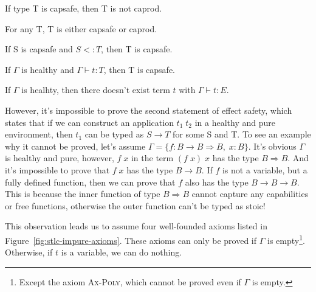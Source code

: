 \begin{lemma}
 If type T is capsafe, then T is not caprod.
\end{lemma}

\begin{lemma}
 For any T, T is either capsafe or caprod.
\end{lemma}

\begin{lemma}
 If S is capsafe and $S <: T$, then T is capsafe.
\end{lemma}

\begin{lemma}
  If $\Gamma$ is healthy and $\Gamma \vdash t : T$, then T is capsafe.
\end{lemma}

\begin{theorem}
  If $\Gamma$ is healhty, then there doesn't exist term $t$ with
  $\Gamma \vdash t : E$.
\end{theorem}

However, it's impossible to prove the second statement of effect
safety, which states that if we can construct an application
$t_1 \; t_2$ in a healthy and pure environment, then $t_1$ can be
typed as $S \to T$ for some S and T. To see an example why it cannot
be proved, let's assume
$\Gamma = \{f: B \to B \Rightarrow B, \; x: B\}$. It's obvious
$\Gamma$ is healthy and pure, however, $f \; x$ in the term
$(f \; x) \;x$ has the type $B \Rightarrow B$. And it's impossible to
prove that $f \; x$ has the type $B \to B$. If $f$ is not a variable,
but a fully defined function, then we can prove that $f$ also has the
type $B \to B \to B$. This is because the inner function of type
$B \Rightarrow B$ cannot capture any capabilities or free functions,
otherwise the outer function can't be typed as stoic!

This observation leads us to assume four well-founded axioms listed in
Figure~\ref{fig:stlc-impure-axioms}. These axioms can only be proved
if $\Gamma$ is empty\footnote{Except the axiom \textsc{Ax-Poly}, which
  cannot be proved even if $\Gamma$ is empty.}. Otherwise, if $t$ is a
variable, we can do nothing.

